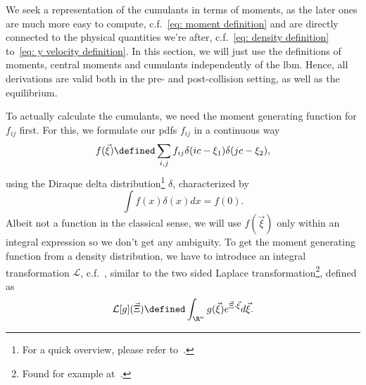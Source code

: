 We seek a representation of the cumulants in terms of moments, as the later ones are much more easy to compute, c.f.~\eqref{eq: moment definition} and are directly connected to the physical quantities we're after, c.f.~\eqref{eq: density definition} to~\eqref{eq: y velocity definition}.
In this section, we will just use the definitions of moments, central moments and cumulants independently of the \gls{lbm}.
Hence, all derivations are valid both in the pre- and post-collision setting, as well as the equilibrium.

To actually calculate the cumulants, we need the moment generating function for $f_{ij}$ first.
For this, we formulate our \glspl{pdf} $f_{ij}$ in a continuous way
\begin{equation}
  \label{eq:Definition of f xi}
  f(\vec{\xi}) \defined \sum_{i,j} f_{ij}\delta(ic - \xi_1)\delta(jc - \xi_2),
\end{equation}
using the Diraque delta distribution\footnote{For a quick overview, please refer to~\cite{weissteinDelta}.} $\delta$, characterized by
\begin{equation}
  \label{eq: diraque feature}
  \int f(x)\delta(x)dx = f(0).
\end{equation}
Albeit not a function in the classical sense, we will use $f(\vec{\xi})$ only within an integral expression so we don't get any ambiguity.
To get the moment generating function from a density distribution, we have to introduce an integral transformation $\mathcal{L}$, c.f.~\cite{weissteinMGF}, similar to the two sided Laplace transformation\footnote{Found for example at~\cite{weissteinLaplace}.}, defined as
\begin{equation*}
  \label{eq: Definition of integral transformation}
  \mathcal{L}[g](\vec{\Xi}) \defined \int_{\R^n} g(\vec{\xi}) e^{\vec{\Xi} \cdot \vec{\xi}}d\vec{\xi}.
\end{equation*}

